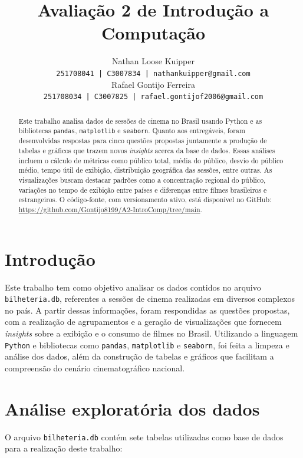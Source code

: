 \documentclass{article}
\title{Avaliação 2 de Introdução a Computação}
\author{Nathan Loose Kuipper \\ \small{\texttt{251708041 | C3007834 | nathankuipper@gmail.com}} \\ Rafael Gontijo Ferreira \\ \small{\texttt{251708034 | C3007825 | rafael.gontijof2006@gmail.com}} }
\begin{document}
\maketitle

\begin{abstract}
Este trabalho analisa dados de sessões de cinema no Brasil usando Python e as bibliotecas \texttt{pandas}, \texttt{matplotlib} e \texttt{seaborn}. Quanto aos entregáveis, foram desenvolvidas respostas para cinco questões propostas juntamente a produção de tabelas e gráficos que trazem novos \textit{insights} acerca da base de dados. Essas análises incluem o cálculo de métricas como público total, média do público, desvio do público médio, tempo útil de exibição, distribuição geográfica das sessões, entre outras. As visualizações buscam destacar padrões como a concentração regional do público, variações no tempo de exibição entre países e diferenças entre filmes brasileiros e estrangeiros. O código-fonte, com versionamento ativo, está disponível no GitHub: \url{https://github.com/Gontijo8199/A2-IntroComp/tree/main}.
\end{abstract}
\pagebreak
\section{Introdução}
Este trabalho tem como objetivo analisar os dados contidos no arquivo \texttt{bilheteria.db}, referentes a sessões de cinema realizadas em diversos complexos no país. A partir dessas informações, foram respondidas as questões propostas, com a realização de agrupamentos e a geração de visualizações que fornecem \textit{insights} sobre a exibição e o consumo de filmes no Brasil. Utilizando a linguagem \texttt{Python} e bibliotecas como \texttt{pandas}, \texttt{matplotlib} e \texttt{seaborn}, foi feita a limpeza e análise dos dados, além da construção de tabelas e gráficos que facilitam a compreensão do cenário cinematográfico nacional.

\section{Análise exploratória dos dados}

O arquivo \texttt{bilheteria.db} contém sete tabelas utilizadas como base de dados para a realização deste trabalho:
\end{document}
